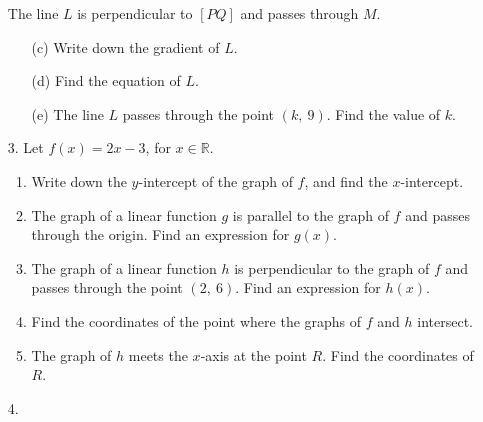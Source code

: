 \documentclass[12pt, twoside]{article}
\begin{document}
\begin{enumerate}[itemsep=0.15cm]
The line $L$ is perpendicular to $[PQ]$ and passes through $M$.

\begin{enumerate}[itemsep=0.1cm]
  \item[(c)] Write down the gradient of $L$.
  \item[(d)] Find the equation of $L$.
  \item[(e)] The line $L$ passes through the point $(k,\ 9)$. Find the value
  of $k$.
\end{enumerate}


\newpage

\item[3.]
Let $f(x) = 2x - 3$, for $x \in \mathbb{R}$.

\begin{enumerate}[itemsep=0.1cm]
  \item Write down the $y$-intercept of the graph of $f$, and find the
  $x$-intercept.
  \item The graph of a linear function $g$ is parallel to the graph of $f$
  and passes through the origin. Find an expression for $g(x)$.
  \item The graph of a linear function $h$ is perpendicular to the graph of
  $f$ and passes through the point $(2,\ 6)$. Find an expression for $h(x)$.
  \item Find the coordinates of the point where the graphs of $f$ and $h$
  intersect.
  \item The graph of $h$ meets the $x$-axis at the point $R$. Find the
  coordinates of $R$.
\end{enumerate}


\newpage

\item[4.]


\end{enumerate}
\end{document}
